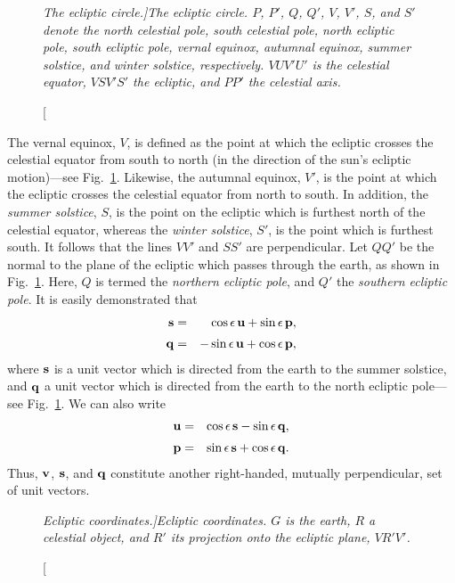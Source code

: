 \begin{figure}
\epsfysize=3in
\centerline{}
\caption[\em The ecliptic circle.]{\em The ecliptic circle. $P$, $P'$, $Q$, $Q'$, $V$, $V'$, $S$, 
and $S'$ denote the north celestial pole, south celestial pole, north ecliptic pole, south
ecliptic pole, vernal equinox, autumnal equinox, summer solstice, and winter
solstice, respectively. $VUV'U'$ is the celestial equator, $VSV'S'$ the ecliptic, and $PP'$ the
celestial axis.}\label{f3}
\end{figure}

The vernal equinox, $V$, is defined as the point at which the ecliptic crosses the celestial equator
from south to north (in the direction of the sun's ecliptic motion)---see Fig.~\ref{f3}. Likewise, the autumnal equinox, $V'$, is the point at which the ecliptic crosses the
celestial equator from north to south.  In addition, the {\em summer solstice}, $S$, is the
point on the ecliptic which is furthest north of the celestial equator, whereas the
{\em winter solstice}, $S'$, is the  point which is furthest south. It follows that the lines $VV'$ and $SS'$
are perpendicular. Let $QQ'$ be the normal to the plane of the ecliptic which passes through the earth, as shown in Fig.~\ref{f3}.  
Here, $Q$ is termed the {\em northern ecliptic pole}, and $Q'$ the {\em southern ecliptic pole}. 
It is easily demonstrated that
\begin{eqnarray}
{\bf s} &=& \cos\epsilon\,{\bf u}+ \sin\epsilon\,{\bf p},\label{e4}\\[0.5ex]
{\bf q} &=& -\sin \epsilon\,{\bf u} + \cos\epsilon\,{\bf p},\label{e5}
\end{eqnarray}
where ${\bf s}$ is a unit vector which is directed from the earth to the summer solstice, and ${\bf q}$ a unit vector which is directed from the earth to the north ecliptic pole---see Fig.~\ref{f3}. We can also write
\begin{eqnarray}
{\bf u} &=& \cos\epsilon\,{\bf s} - \sin\epsilon\,{\bf q},\label{e4p}\\[0.5ex]
{\bf p} &=& \sin\epsilon\,{\bf s} + \cos\epsilon\,{\bf q}.\label{e5p}
\end{eqnarray}
Thus, ${\bf v}$, ${\bf s}$, and ${\bf q}$ constitute another right-handed, mutually perpendicular, set of unit vectors. 

\begin{figure}
\epsfysize=3in
\centerline{}
\caption[\em Ecliptic coordinates.]{\em Ecliptic coordinates. $G$ is the earth, $R$ a celestial
object, and $R'$ its projection onto the ecliptic plane, $VR'V'$.}\label{f4}
\end{figure}

